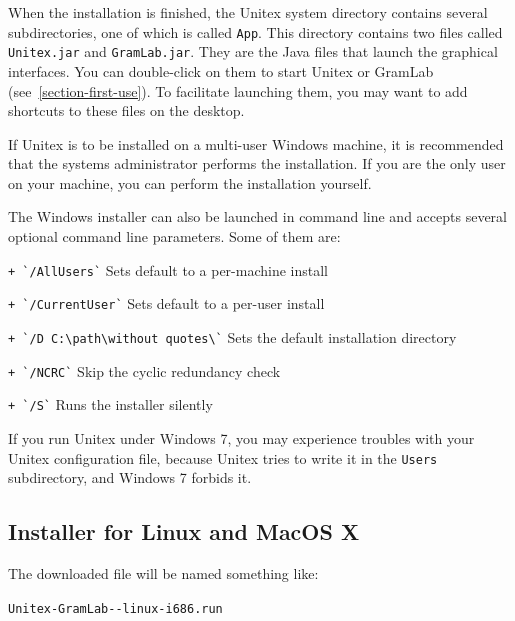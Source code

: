 \bigskip
\noindent When the installation is finished, the Unitex system directory
contains several subdirectories,  one  of which is called \verb+App+. This directory contains two
files called \verb+Unitex.jar+ and \verb+GramLab.jar+. They
are the Java files that launch the graphical interfaces. You can double-click on them to start
Unitex or GramLab (see~\ref{section-first-use}). To facilitate launching them, you may want to
add shortcuts to these files on the desktop.

\bigskip
\noindent If Unitex is to be installed on a multi-user Windows machine, it is recommended
that the systems administrator performs the installation. If you are the only
user on your machine, you can perform the installation  yourself.

\bigskip
\noindent The Windows installer can also be launched in command line and accepts several optional
command line parameters. Some of them are:

\verb|+ `/AllUsers`|                              \hspace{.15in} Sets default to a per-machine install

\verb|+ `/CurrentUser`|                        \hspace{.15in} Sets default to a per-user install

\verb|+ `/D C:\path\without quotes\`| \hspace{.15in} Sets the default installation directory

\verb|+ `/NCRC`|                                  \hspace{.15in} Skip the cyclic redundancy check

\verb|+ `/S`|                                         \hspace{.15in} Runs the installer silently

\bigskip
\noindent If you run Unitex under Windows 7, you may experience troubles with your Unitex configuration
file, because Unitex tries to write it in the \verb+Users+ subdirectory, and Windows 7 forbids it.

\subsection{Installer for Linux and MacOS X}
The downloaded file will be named something like:

{\tt Unitex-GramLab-\UnitexVersion{}-linux-i686.run}


